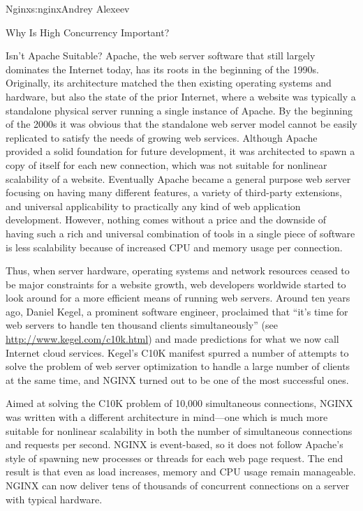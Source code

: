 \begin{aosachapter}{Nginx}{s:nginx}{Andrey Alexeev}
\begin{aosasect1}{Why Is High Concurrency Important?}
\begin{aosasect2}{Isn't Apache Suitable?}
Apache, the web server software that still largely dominates the
Internet today, has its roots in the beginning of the
1990s. Originally, its architecture matched the then existing
operating systems and hardware, but also the state of the prior
Internet, where a website was typically a standalone physical server
running a single instance of Apache. By the beginning of the 2000s it
was obvious that the standalone web server model cannot be easily
replicated to satisfy the needs of growing web services. Although
Apache provided a solid foundation for future development, it was
architected to spawn a copy of itself for each new connection, which
was not suitable for nonlinear scalability of a website. Eventually
Apache became a general purpose web server focusing on having many
different features, a variety of third-party extensions, and universal
applicability to practically any kind of web application
development. However, nothing comes without a price and the downside
of having such a rich and universal combination of tools in a single
piece of software is less scalability because of increased CPU and
memory usage per connection.

Thus, when server hardware, operating systems and network resources
ceased to be major constraints for a website growth, web developers
worldwide started to look around for a more efficient means of running
web servers. Around ten years ago, Daniel Kegel, a prominent software
engineer, proclaimed that ``it's time for web servers to handle ten
thousand clients simultaneously'' (see
\url{http://www.kegel.com/c10k.html}) and made predictions for what we
now call Internet cloud services. Kegel's C10K manifest spurred a
number of attempts to solve the problem of web server optimization to
handle a large number of clients at the same time, and NGINX turned
out to be one of the most successful ones.

Aimed at solving the C10K problem of 10,000 simultaneous connections,
NGINX was written with a different architecture in mind---one which is
much more suitable for nonlinear scalability in both the number of
simultaneous connections and requests per second. NGINX is
event-based, so it does not follow Apache's style of spawning new
processes or threads for each web page request. The end result is that
even as load increases, memory and CPU usage remain manageable. NGINX
can now deliver tens of thousands of concurrent connections on a
server with typical hardware.


\end{aosasect2}
\end{aosasect1}
\end{aosachapter}
